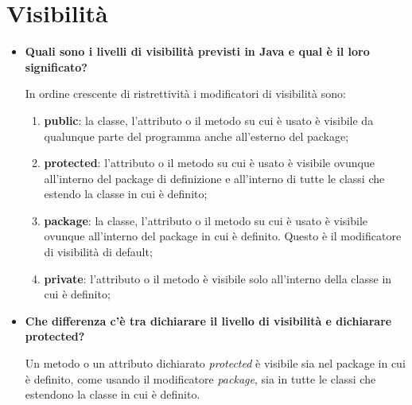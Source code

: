 \documentclass[12pt, a4paper]{article}
\begin{document}
\section{Visibilità}
\begin{itemize}
    \item \textbf{Quali sono i livelli di visibilità previsti in Java e qual è il loro significato?}
    
    In ordine crescente di ristrettività i modificatori di visibilità sono:
    \begin{enumerate}
        \item \textbf{public}: la classe, l'attributo o il metodo su cui è usato è
        visibile da qualunque parte del programma anche all'esterno del package;
        \item \textbf{protected}: l'attributo o il metodo su cui è usato è visibile
        ovunque all'interno del package di definizione e all'interno di tutte le classi
        che estendo la classe in cui è definito;
        \item \textbf{package}: la classe, l'attributo o il metodo su cui è usato è
        visibile ovunque all'interno del package in cui è definito. Questo è il
        modificatore di visibilità di default;
        \item \textbf{private}: l'attributo o il metodo è visibile solo all'interno
        della classe in cui è definito;
    \end{enumerate}

    \item \textbf{Che differenza c'è tra dichiarare il livello di visibilità e dichiarare protected?}
    
    Un metodo o un attributo dichiarato \emph{protected} è visibile sia nel package in
    cui è definito, come usando il modificatore \emph{package}, sia in tutte le
    classi che estendono la classe in cui è definito.
\end{itemize}
\end{document}
